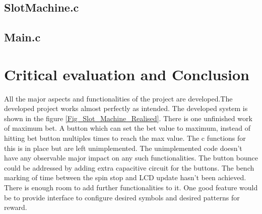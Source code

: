 \documentclass[a4paper,13pt,openany,sffamily]{memoir}
\begin{document}
\newpage
\section{SlotMachine.c}
\begin{small}

\end{small}


\newpage
\section{Main.c}
\begin{small}

\end{small}




\chapter {Critical evaluation and Conclusion}
All the major aspects and functionalities of the project are developed.The developed project works almost perfectly as intended. The developed system is shown in the figure \ref{Fig_Slot_Machine_Realised}. There is one unfinished work of maximum bet. A button which can set the bet value to maximum, instead of hitting bet button multiples times to reach the max value. The c functions for this is in place but are left unimplemented. The unimplemented code doesn't have any observable major impact on any such functionalities. The button bounce could be addressed by adding extra capacitive circuit for the buttons. The bench marking of time between the spin stop and LCD update hasn't been achieved. There is enough room to add further functionalities to it. One good feature would be to provide interface to configure desired symbols and desired patterns for reward.   
\end{document}
